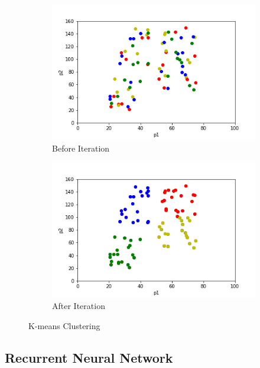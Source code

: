 \documentclass[11pt]{article} %
\theoremstyle{plain}
\theoremstyle{definition}
\newcommand*{\figuretitle}[1]{
  {
    \centering
    \text{#1}
    \par\medskip
  }
}
\begin{document}
\begin{figure}[ht]
  \centering
  \figuretitle{K = 4}
  \begin{subfigure}[b]{0.48\textwidth}
    \includegraphics[width=\linewidth, center]{resources/kmeans_before.png}
    \caption{Before Iteration}
    \label{fig:before_iter}
  \end{subfigure}
  \begin{subfigure}[b]{0.48\textwidth}
    \includegraphics[width=\linewidth, center]{resources/kmeans_after.png}
    \caption{After Iteration}
    \label{fig:after_iter}
  \end{subfigure}
  \caption{K-means Clustering}
  \label{fig:kmeans}
\end{figure}

\subsection{Recurrent Neural Network}
\end{document}
